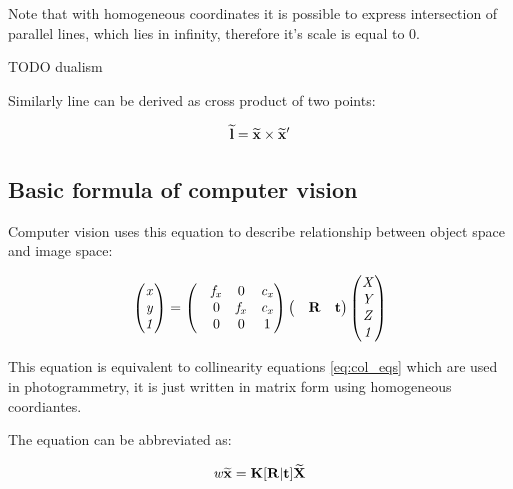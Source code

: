 \documentclass[a4paper,12pt]{report}
\newcommand{\ematr}[1]{
{\bf #1}
}
\newcommand{\evect}[1]{
{\bf #1}
}
\newcommand{\ehvect}[1]{
{\bf \widetilde{#1}}
}
\newcommand{\escal}[1]{
{\it #1}
}
\begin{document}
Note that with homogeneous coordinates it is possible to express intersection of parallel lines, which lies in infinity, 
therefore it's scale is equal to 0.

TODO dualism

Similarly line can be derived as cross product of two points:

\begin{equation}
\ehvect{l} = \ehvect{x} \times \ehvect{x}'
\end{equation}


\subsection{Basic formula of computer vision}

Computer vision uses this equation to describe relationship between
object space and image space:

\begin{equation}
\begin{pmatrix}
   \escal{x} \\
   \escal{y} \\
   \escal{1} \\
\end{pmatrix}
=
\begin{pmatrix}
   & \escal{f_{x}} & 0     & \escal{c_{x}}\\
   & 0     & \escal{f_{x}} & \escal{c_{x}}\\
   & 0     & 0     & 1\\
\end{pmatrix}
\begin{pmatrix}
   &\ematr{R} & \evect{t}\\
\end{pmatrix}
\begin{pmatrix}
   \escal{X} \\
   \escal{Y} \\
   \escal{Z} \\
   \escal{1} \\
\end{pmatrix}
\end{equation}

This equation is equivalent to collinearity equations \eqref{eq:col_eqs} which are used in photogrammetry,
it is just written in matrix form using homogeneous coordiantes.

The equation can be abbreviated as:

\begin{equation}
\escal{w} \ehvect{x} = \ematr{K} \ematr{[}\ematr{R}|\evect{t}\ematr{]} \ehvect{X}
\label{eq:p_exp}
\end{equation}
\end{document}
